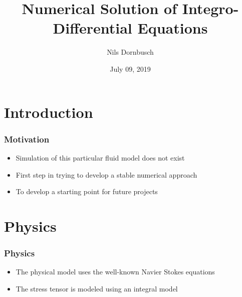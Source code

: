 \documentclass[12pt,a4paper,handout]{beamer}
\theoremstyle{definition}
\theoremstyle{plain}
\begin{document}
    \title{Numerical Solution of Integro-Differential Equations}
    \author{Nils Dornbusch}
    \date{July 09, 2019}
    \maketitle
    \begin{frame}
    \tableofcontents[pausesections]
    \end{frame}
\section{Introduction}
\begin{frame}
    \frametitle{Motivation}
    \begin{itemize}[<+->]
        \item Simulation of this particular fluid model does not exist 
        \item First step in trying to develop a stable numerical approach
        \item To develop a starting point for future projects
    \end{itemize}
\end{frame}
\section{Physics}
    \begin{frame}
        \frametitle{Physics}
        \begin{itemize}[<+->]
            \item  The physical model uses the well-known Navier Stokes equations
            \item The stress tensor is modeled using an integral model
        \end{itemize}
    \end{frame}
\end{document}
